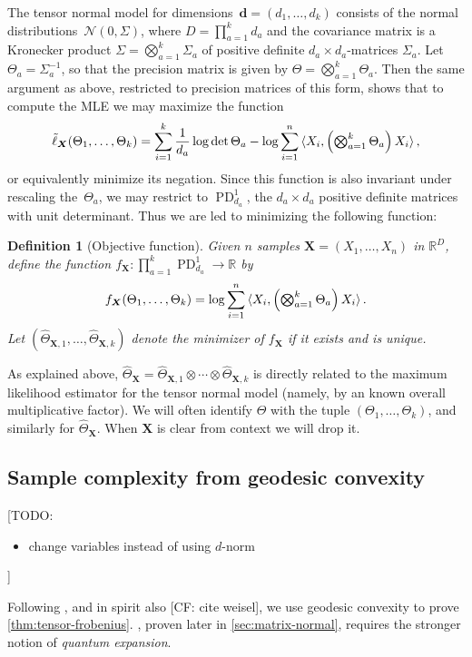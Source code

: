 \documentclass{article}
\newtheorem{definition}{Definition}
\newcommand{\R}{{\mathbb{R}}}
\newcommand{\ot}{\otimes}
\renewcommand{\vec}{\bm}
\newcommand\cN{\mathcal{N}}
\newcommand\PD{\operatorname{PD}}
\newcommand{\CF}[1]{{\color{purple}[CF: #1]}}
\newcommand{\TODO}[1]{{\color{blue}[TODO: #1]}}
\begin{document}
The tensor normal model for dimensions~$\vec d=(d_1,\dots,d_k)$ consists of the normal distributions~$\cN(0,\Sigma)$, where $D = \prod_{a=1}^k d_a$ and the covariance matrix is a Kronecker product $\Sigma = \bigotimes_{a=1}^k \Sigma_a$ of positive definite $d_a\times d_a$-matrices $\Sigma_a$.
Let $\Theta_a = \Sigma_a^{-1}$, so that the precision matrix is given by $\Theta = \bigotimes_{a=1}^k \Theta_a$.
Then the same argument as above, restricted to precision matrices of this form, shows that to compute the MLE we may maximize the function
\begin{align*}
  \tilde\ell_{\vec X}(\Theta_1,\dots,\Theta_k) = \sum_{i=1}^k \frac1{d_a} \log \det \Theta_a - \log \sum_{i=1}^n \braket{X_i, \left( \textstyle \bigotimes_{a=1}^k \Theta_a \right) X_i},
\end{align*}
or equivalently minimize its negation.
Since this function is also invariant under rescaling the~$\Theta_a$, we may restrict to $\PD_{d_a}^1$, the $d_a\times d_a$ positive definite matrices with unit determinant.
Thus we are led to minimizing the following function:

\begin{definition}[Objective function]\label{dfn:function}
Given $n$ samples $\vec{X} = (X_1, \dots, X_n)$ in $\R^D$, define the function $f_{\vec X}\colon\prod_{a=1}^k \PD_{d_a}^1 \to \R$ by
\begin{align}\label{eq:projective-likelihood}
  f_{\vec X}(\Theta_1,\dots,\Theta_k) = \log \sum_{i=1}^n \braket{X_i, \left( \textstyle \bigotimes_{a=1}^k \Theta_a \right) X_i}.
\end{align}
Let $(\widehat{\Theta}_{\vec X,1}, \dots, \widehat{\Theta}_{\vec X,k})$ denote the minimizer of $f_{\vec X}$ if it exists and is unique.
\end{definition}

\noindent
As explained above, $\widehat{\Theta}_{\vec X} = \widehat{\Theta}_{\vec X,1} \ot \cdots \ot \widehat{\Theta}_{\vec X,k}$ is directly related to the maximum likelihood estimator for the tensor normal model (namely, by an known overall multiplicative factor).
We will often identify $\Theta$ with the tuple $(\Theta_1,\dots,\Theta_k)$, and similarly for $\widehat{\Theta}_{\vec X}$.
When $\vec X$ is clear from context we will drop it.


\subsection{Sample complexity from geodesic convexity}\label{subsec:outline}
\TODO{
\begin{itemize}
\item change variables instead of using $d$-norm
\end{itemize}}
Following \cite{FM20}, and in spirit also \CF{cite weisel}, we use geodesic convexity to prove \cref{thm:tensor-frobenius}.
, proven later in \cref{sec:matrix-normal}, requires the stronger notion of \emph{quantum expansion}.
\end{document}
